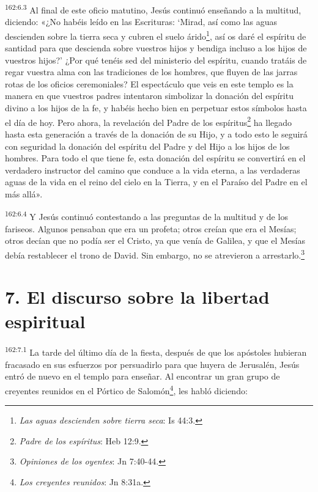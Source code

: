 \par
\textsuperscript{162:6.3} Al final de este oficio matutino, Jesús continuó enseñando a la multitud, diciendo: «¿No habéis leído en las Escrituras: `Mirad, así como las aguas descienden sobre la tierra seca y cubren el suelo árido\footnote{\textit{Las aguas descienden sobre tierra seca}: Is 44:3.}, así os daré el espíritu de santidad para que descienda sobre vuestros hijos y bendiga incluso a los hijos de vuestros hijos?' ¿Por qué tenéis sed del ministerio del espíritu, cuando tratáis de regar vuestra alma con las tradiciones de los hombres, que fluyen de las jarras rotas de los oficios ceremoniales? El espectáculo que veis en este templo es la manera en que vuestros padres intentaron simbolizar la donación del espíritu divino a los hijos de la fe, y habéis hecho bien en perpetuar estos símbolos hasta el día de hoy. Pero ahora, la revelación del Padre de los espíritus\footnote{\textit{Padre de los espíritus}: Heb 12:9.} ha llegado hasta esta generación a través de la donación de su Hijo, y a todo esto le seguirá con seguridad la donación del espíritu del Padre y del Hijo a los hijos de los hombres. Para todo el que tiene fe, esta donación del espíritu se convertirá en el verdadero instructor del camino que conduce a la vida eterna, a las verdaderas aguas de la vida en el reino del cielo en la Tierra, y en el Paraíso del Padre en el más allá».

\par
\textsuperscript{162:6.4} Y Jesús continuó contestando a las preguntas de la multitud y de los fariseos. Algunos pensaban que era un profeta; otros creían que era el Mesías; otros decían que no podía ser el Cristo, ya que venía de Galilea, y que el Mesías debía restablecer el trono de David. Sin embargo, no se atrevieron a arrestarlo.\footnote{\textit{Opiniones de los oyentes}: Jn 7:40-44.}

\section*{7. El discurso sobre la libertad espiritual}
\par
\textsuperscript{162:7.1} La tarde del último día de la fiesta, después de que los apóstoles hubieran fracasado en sus esfuerzos por persuadirlo para que huyera de Jerusalén, Jesús entró de nuevo en el templo para enseñar. Al encontrar un gran grupo de creyentes reunidos en el Pórtico de Salomón\footnote{\textit{Los creyentes reunidos}: Jn 8:31a.}, les habló diciendo:


